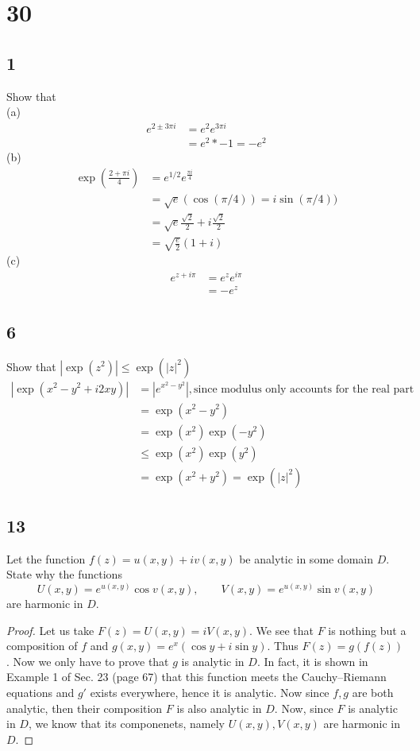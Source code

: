 \documentclass{article}
\begin{document}
    \section*{30}
    \subsection*{1}
    Show that \\
    (a) \begin{align*}
        e^{2\pm 3\pi i} &= e^2 e^{3\pi i} \\
            &= e^2 * -1 = -e^2
    \end{align*}
    (b) \begin{align*}
        \exp(\frac{2+ \pi i}{4}) &= e^{1/2}e^{\frac{\pi i}{4}} \\
                &= \sqrt{e}(\cos(\pi / 4)) = i\sin(\pi / 4)) \\
                &= \sqrt{e}\frac{\sqrt{2}}{2} + i\frac{\sqrt{2}}{2} \\
                &= \sqrt{\frac{e}{2}}(1 + i)
    \end{align*}
    (c) \begin{align*}
        e^{z + i\pi} &= e^{z}e^{i\pi} \\
            &= -e^z
    \end{align*} 
    \subsection*{6}
    Show that $|\exp(z^2)| \leq \exp(|z|^2)$
    \begin{align*}
        |\exp(x^2 - y^2 + i2xy)| &= |e^{x^2 - y^2}|, \text{since modulus only accounts for the real part} \\
        &= \exp(x^2 - y^2) \\
        &= \exp(x^2)\exp(-y^2) \\
        &\leq \exp(x^2)\exp(y^2) \\
        &= \exp(x^2 + y^2) = \exp(|z|^2)
    \end{align*}
    \subsection*{13}
    Let the function $f(z)= u(x,y) + iv(x,y)$ be analytic in some domain $D$. State
    why the functions $$U(x,y) = e^{u(x,y)}\cos v(x,y), \qquad
    V(x,y) = e^{u(x,y)}\sin v(x,y)$$ are harmonic in $D$.
    \begin{proof}
        Let us take $F(z) = U(x,y) = iV(x,y)$. We see that $F$ is nothing but a 
        composition of $f$ and $g(x,y) = e^x(\cos y + i\sin y)$. Thus 
        $F(z) = g(f(z))$. Now we only have to prove that $g$ is analytic in $D$.
        In fact, it is shown in Example 1 of Sec. 23 (page 67) that this function 
        meets the Cauchy–Riemann equations and $g'$ exists everywhere, hence it is 
        analytic. Now since $f, g$ are both analytic, then their composition $F$
        is also analytic in $D$. Now, since $F$ is analytic in $D$, we know that its
        componenets, namely $U(x,y), V(x,y)$ are harmonic in $D$.
    \end{proof}
\end{document}
